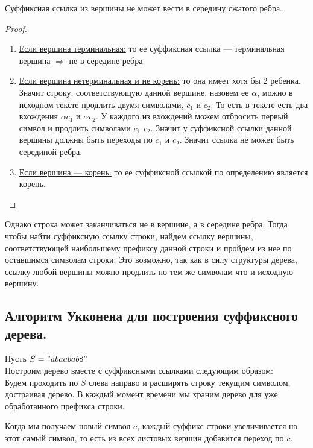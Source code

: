 \begin{prop}
    Суффиксная ссылка из вершины не может вести в середину сжатого ребра. 
\end{prop}

\begin{proof} \ \\
    \begin{enumerate}
        \item \underline{Если вершина терминальная:} 
            то ее суффиксная ссылка --- терминальная вершина $\Rightarrow$ не в середине ребра.

        \item \underline{Если вершина нетерминальная и не корень:}
            то она имеет хотя бы 2 ребенка. Значит строку, соответствующую данной вершине, назовем ее $\alpha$, можно в исходном тексте продлить двумя символами, $c_1$ и $c_2$. 
            То есть в тексте есть два вхождения $\alpha c_1$ и $\alpha c_2$.
            У каждого из вхождений можем отбросить первый символ и продлить символами $c_1$ $c_2$. Значит у суффиксной ссылки данной вершины должны быть переходы по $c_1$ и $c_2$. Значит ссылка не может быть серединой ребра. 

        \item \underline{Если вершина --- корень:} то ее суффиксной ссылкой по определению является корень.
    \end{enumerate}
\end{proof}

Однако строка может заканчиваться не в вершине, а в середине ребра. Тогда чтобы найти суффиксную ссылку строки, найдем ссылку вершины, соответствующей наибольшему префиксу данной строки и пройдем из нее по оставшимся символам строки. Это возможно, так как в силу структуры дерева, ссылку любой вершины можно продлить по тем же символам что и исходную вершину.

\subsection{Алгоритм Укконена для построения суффиксного дерева.}
Пусть $S = "abaabab\$"$\\
Построим дерево вместе с суффиксными ссылками следующим образом: \\
Будем проходить по $S$ слева направо и расширять строку текущим символом, достраивая дерево. 
В каждый момент времени мы храним дерево для уже обработанного префикса строки. 

Когда мы получаем новый символ $c$, каждый суффикс строки увеличивается на этот самый символ, то есть из всех листовых вершин добавится переход по $c$.


